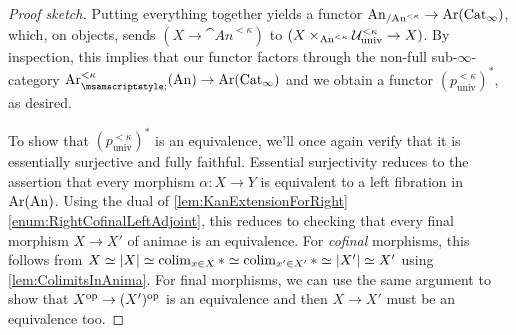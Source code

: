 \begin{proof}[Proof sketch]
	Putting everything together yields a functor $\mathrm{An}_{/\mathrm{An}^{<\kappa}}\rightarrow \operatorname{Ar}(\mathrm{Cat}_\infty)$, which, on objects, sends $(X\rightarrow \cat{An}^{<\kappa})$ to $(X\times_{\mathrm{An}^{<\kappa}}\mathcal{U}_\mathrm{univ}^{<\kappa}\rightarrow X)$. By inspection, this implies that our functor factors through the non-full sub-$\infty$-category $\Ar_{\pullbacksign \vphantom{^t}}^{<\kappa}(\cat{An})\rightarrow \Ar(\cat{Cat}_\infty)$ and we obtain a functor $(p_\mathrm{univ}^{<\kappa})^*$, as desired.
	
	To show that $(p_\mathrm{univ}^{<\kappa})^*$ is an equivalence, we'll once again verify that it is essentially surjective and fully faithful. Essential surjectivity reduces to the assertion that every morphism $\alpha\colon X\rightarrow Y$ is equivalent to a left fibration in $\operatorname{Ar}(\mathrm{An})$. Using the dual of \cref{lem:KanExtensionForRight}\cref{enum:RightCofinalLeftAdjoint}, this reduces to checking that every final morphism $X\rightarrow X'$ of animae is an equivalence. For \emph{cofinal} morphisms, this follows from $X\simeq \left|X\right|\simeq \operatorname*{colim}_{x\in X}*\simeq \operatorname*{colim}_{x'\in X'}*\simeq \left|X'\right|\simeq X'$ using \cref{lem:ColimitsInAnima}. For final morphisms, we can use the same argument to show that $X^{\mathrm{op}}\rightarrow (X')^{\mathrm{op}}$ is an equivalence and then $X\rightarrow X'$ must be an equivalence too.
	

\end{proof}
